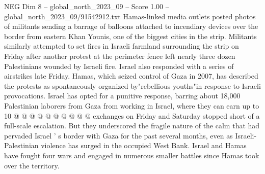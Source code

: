 \begin{textsample}{NEG Dim 8 – global\_north\_2023\_09 – Score 1.00 – global\_north\_2023\_09/91542912.txt}
Hamas-linked media outlets posted photos of militants sending a barrage of balloons attached to incendiary devices over the border from eastern Khan Younis, one of the biggest cities in the strip.
Militants similarly attempted to set fires in Israeli farmland surrounding the strip on Friday after another protest at the perimeter fence left nearly three dozen Palestinians wounded by Israeli fire.
Israel also responded with a series of airstrikes late Friday.
Hamas, which seized control of Gaza in 2007, has described the protests as spontaneously organized by"rebellious youths"in response to Israeli provocations.
Israel has opted for a punitive response, barring about 18,000 Palestinian laborers from Gaza from working in Israel, where they can earn up to 10 @ @ @ @ @ @ @ @ @ @ exchanges on Friday and Saturday stopped short of a full-scale escalation.
But they underscored the fragile nature of the calm that had pervaded Israel ' s border with Gaza for the past several months, even as Israeli-Palestinian violence has surged in the occupied West Bank.
Israel and Hamas have fought four wars and engaged in numerous smaller battles since Hamas took over the territory.

\end{textsample}

